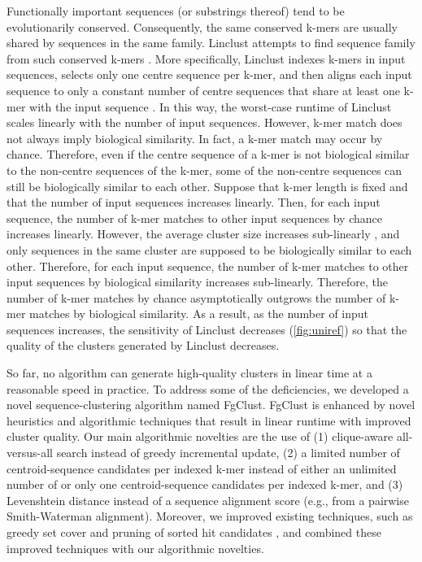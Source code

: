 \documentclass{bioinfo}
\begin{document}
Functionally important sequences (or substrings thereof) tend to be evolutionarily conserved.
Consequently, the same conserved k-mers are usually shared by sequences in the same family.
Linclust attempts to find sequence family from such conserved k-mers \citep{steinegger2017linclust}.
More specifically, 
Linclust indexes k-mers in input sequences, 
selects only one centre sequence per k-mer,
and then aligns each input sequence to only a constant number of centre sequences that share at least one k-mer with the input sequence \citep{steinegger2017linclust}.
In this way, the worst-case runtime of Linclust scales linearly with the number of input sequences.
However, k-mer match does not always imply biological similarity.
In fact, a k-mer match may occur by chance.
Therefore,
even if the centre sequence of a k-mer is not biological similar to the non-centre sequences of the k-mer, 
some of the non-centre sequences can still be biologically similar to each other.
Suppose that k-mer length is fixed and that the number of input sequences increases linearly.
Then, for each input sequence,
the number of k-mer matches to other input sequences by chance increases linearly.
However,
the average cluster size increases sub-linearly \citep[Fig. 3]{suzek2014uniref},
and only sequences in the same cluster are supposed to be biologically similar to each other.
Therefore,
for each input sequence,
the number of k-mer matches to other input sequences by biological similarity increases sub-linearly.
Therefore, the number of k-mer matches by chance asymptotically outgrows the number of k-mer matches by biological similarity.
As a result, as the number of input sequences increases, 
the sensitivity of Linclust decreases (\cref{fig:uniref}) so that the quality of the clusters generated by Linclust decreases.

So far, no algorithm can generate high-quality clusters in linear time at a reasonable speed in practice.
To address some of the deficiencies,  we developed a novel sequence-clustering algorithm named FgClust.
FgClust is enhanced by novel heuristics and algorithmic techniques that result in linear runtime with improved cluster quality.
Our main algorithmic novelties are the use of (1) clique-aware all-versus-all search instead of greedy incremental update, 
(2) a limited number of centroid-sequence candidates per indexed k-mer instead of either an unlimited number of or only one centroid-sequence candidates per indexed k-mer, and
(3) Levenshtein distance instead of a sequence alignment score (e.g., from a pairwise Smith-Waterman alignment). Moreover, we improved existing techniques, such as greedy set cover \citep{steinegger2017mmseqs2} and pruning of sorted hit candidates \citep{edgar2010search}, and combined these improved techniques with our algorithmic novelties.
\end{document}

